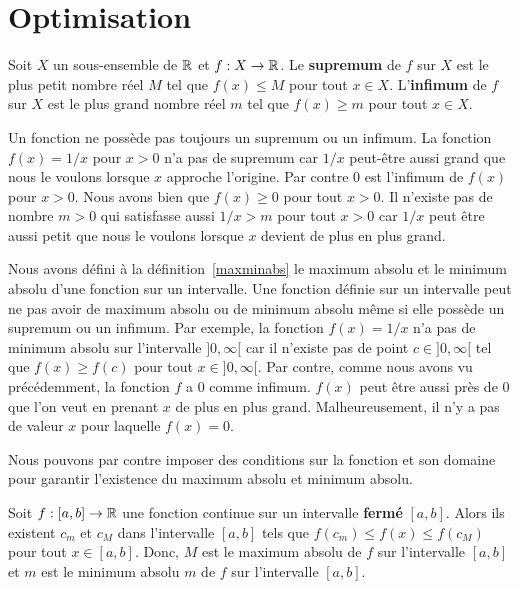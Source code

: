 {\section{Optimisation}\label{Optim1D}

\begin{focus}{\dfn}
Soit $X$ un sous-ensemble de $\mathbb{R}$ et $f:X \rightarrow \mathbb{R}$.  Le
{\bfseries supremum} de $f$ sur $X$ est le plus petit
nombre réel $M$ tel que $f(x) \leq M$ pour tout $x \in X$. 
L'{\bfseries infimum} de $f$ sur $X$ est le plus grand
nombre réel $m$ tel que $f(x) \geq m$ pour tout $x \in X$.
\end{focus}

Un fonction ne possède pas toujours un supremum ou un infimum.
La fonction $f(x) = 1/x$ pour $x>0$ n'a pas de supremum car $1/x$
peut-être aussi grand que nous le voulons lorsque $x$ approche l'origine.
Par contre $0$ est l'infimum de $f(x)$ pour $x>0$.  Nous avons bien que
$f(x) \geq 0$ pour tout $x>0$.  Il n'existe pas de nombre $m>0$ qui
satisfasse aussi $1/x > m$ pour tout $x>0$ car $1/x$ peut être aussi
petit que nous le voulons lorsque $x$ devient de plus en plus grand.

Nous avons défini à la définition~\ref{maxminabs} le maximum absolu et
le minimum absolu d'une fonction sur un intervalle.  Une fonction
définie sur un intervalle peut ne pas avoir de maximum absolu ou de
minimum absolu même si elle possède un supremum ou un infimum.
Par exemple, la fonction $f(x) = 1/x$ n'a pas de minimum absolu sur
l'intervalle $]0,\infty[$ car il n'existe pas de point
$c \in ]0,\infty[$ tel que $f(x) \geq f(c)$ pour tout $x \in ]0,\infty[$.   
Par contre, comme nous avons vu précédemment, la fonction $f$ a $0$
comme infimum.  $f(x)$ peut être aussi près de $0$ que l'on veut en
prenant $x$ de plus en plus grand.  Malheureusement, il n'y a pas de
valeur $x$ pour laquelle $f(x) = 0$.

Nous pouvons par contre imposer des conditions sur la fonction et son
domaine pour garantir l'existence du maximum absolu et minimum
absolu.

\begin{focus}{\thm}
Soit $f:[a,b]\to \mathbb{R}$ une fonction continue sur un intervalle
{\bfseries fermé} $[a,b]$.  Alors ils existent $c_m$ et $c_M$ dans
l'intervalle $[a,b]$ tels que $f(c_m) \leq f(x) \leq f(c_M)$ pour tout
$x \in [a,b]$.  Donc, $M$ est le maximum absolu de $f$ sur
l'intervalle $[a,b]$ et $m$ est le minimum absolu $m$ de $f$ sur
l'intervalle $[a,b]$.
\end{focus}

}
